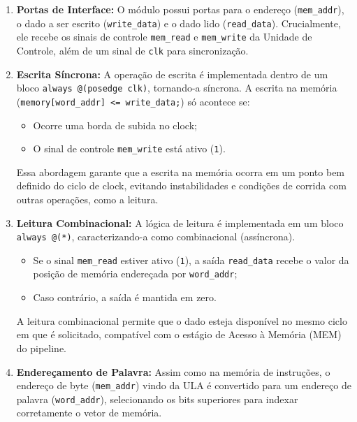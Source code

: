 \documentclass[12pt]{article}
\begin{document}
\begin{enumerate}
    \item \textbf{Portas de Interface:}  
    O módulo possui portas para o endereço (\texttt{mem\_addr}),  
    o dado a ser escrito (\texttt{write\_data}) e o dado lido (\texttt{read\_data}).  
    Crucialmente, ele recebe os sinais de controle \texttt{mem\_read} e \texttt{mem\_write} da Unidade de Controle,  
    além de um sinal de \texttt{clk} para sincronização.

    \item \textbf{Escrita Síncrona:}  
    A operação de escrita é implementada dentro de um bloco \texttt{always @(posedge clk)},  
    tornando-a síncrona.  
    A escrita na memória (\texttt{memory[word\_addr] <= write\_data;}) só acontece se:
    \begin{itemize}
        \item Ocorre uma borda de subida no clock;
        \item O sinal de controle \texttt{mem\_write} está ativo (\texttt{1}).
    \end{itemize}
    Essa abordagem garante que a escrita na memória ocorra em um ponto bem definido do ciclo de clock,  
    evitando instabilidades e condições de corrida com outras operações, como a leitura.

    \item \textbf{Leitura Combinacional:}  
    A lógica de leitura é implementada em um bloco \texttt{always @(*)},  
    caracterizando-a como combinacional (assíncrona).  
    \begin{itemize}
        \item Se o sinal \texttt{mem\_read} estiver ativo (\texttt{1}),  
        a saída \texttt{read\_data} recebe o valor da posição de memória endereçada por \texttt{word\_addr};
        \item Caso contrário, a saída é mantida em zero.
    \end{itemize}
    A leitura combinacional permite que o dado esteja disponível no mesmo ciclo em que é solicitado,  
    compatível com o estágio de Acesso à Memória (MEM) do pipeline.

    \item \textbf{Endereçamento de Palavra:}  
    Assim como na memória de instruções, o endereço de byte (\texttt{mem\_addr}) vindo da ULA  
    é convertido para um endereço de palavra (\texttt{word\_addr}),  
    selecionando os bits superiores para indexar corretamente o vetor de memória.
\end{enumerate}
\end{document}
